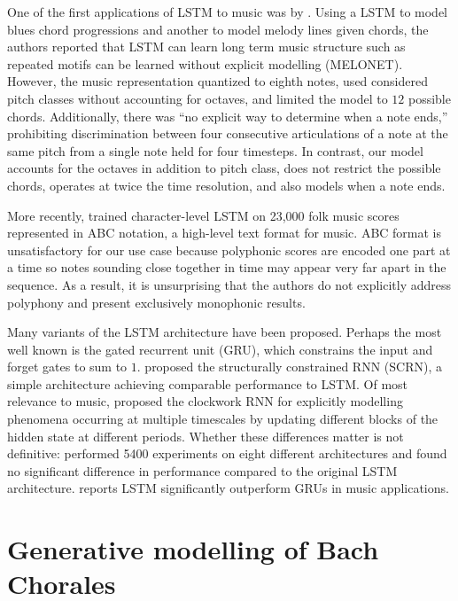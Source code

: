 One of the first applications of LSTM to music was by
\citet{Eck2002,Eck2002-blues}. Using a LSTM to model blues chord progressions
and another to model melody lines given chords, the authors reported that LSTM
can learn long term music structure such as repeated motifs can be learned
without explicit modelling (\eg MELONET). However, the music representation
quantized to eighth notes, used considered pitch classes without accounting for
octaves, and limited the model to $12$ possible chords. Additionally, there was
``no explicit way to determine when a note ends,'' prohibiting discrimination
between four consecutive articulations of a note at the same pitch from a
single note held for four timesteps. In contrast, our model accounts for the
octaves in addition to pitch class, does not restrict the possible chords,
operates at twice the time resolution, and also models when a note ends.

More recently, \citet{sturm2015folk,sturm2016music} trained
character-level LSTM on 23,000 folk music scores represented in ABC
notation\citep{abcstandard}, a high-level text format for music. ABC format is
unsatisfactory for our use case because polyphonic scores are encoded one part
at a time so notes sounding close together in time may appear very far apart in
the sequence. As a result, it is unsurprising that the authors do not
explicitly address polyphony and present exclusively monophonic results.

Many variants of the LSTM architecture have been proposed. Perhaps the most
well known is the gated recurrent unit (GRU)\citep{cho2014learning}, which
constrains the input and forget gates to sum to $1$. \citet{Mikolov2015}
proposed the structurally constrained RNN (SCRN), a simple architecture
achieving comparable performance to LSTM. Of most relevance to music,
\citet{Koutnik2014} proposed the clockwork RNN for explicitly modelling phenomena
occurring at multiple timescales by updating different blocks of the hidden
state at different periods. Whether these differences matter is not definitive:
\citet{greff2015lstm} performed 5400 experiments on eight different
architectures and found no significant difference in performance compared to
the original LSTM architecture. \citet{Nayebi2015} reports LSTM significantly
outperform GRUs in music applications.

\section{Generative modelling of Bach Chorales}


